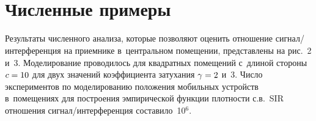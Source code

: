 \begin{multicols}{2}
\begin{figure*} %
\vspace*{1pt}
\begin{minipage}[t]{78mm}
\begin{center}
\mbox{%
\epsfxsize=70.373mm
}
\end{center}
\vspace*{-9pt}
\end{minipage}
\hfill
\vspace*{1pt}
\begin{minipage}[t]{78mm}
\begin{center}
\mbox{%
\epsfxsize=70.342mm
}
\end{center}
\vspace*{-9pt}
\end{minipage}
\vspace*{6pt}
\end{figure*}

\section{Численные примеры}

  Результаты численного анализа, которые позволяют оценить отношение 
сиг\-нал/ин\-тер\-фе\-рен\-ция на приемнике в~центральном помещении, 
пред\-став\-ле\-ны на рис.~2 и~3. Моделирование проводилось для квадратных 
помещений с~длиной стороны $c\hm= 10$ для двух значений коэффициента 
затухания $\gamma\hm=2$ и~3. Число экспериментов по 
моделированию положения мобильных устройств в~помещениях для 
построения эмпирической функции плотности с.в.~SIR отношения  
сиг\-нал/ин\-тер\-фе\-рен\-ция составило~10$^6$. 
  

\end{multicols}
